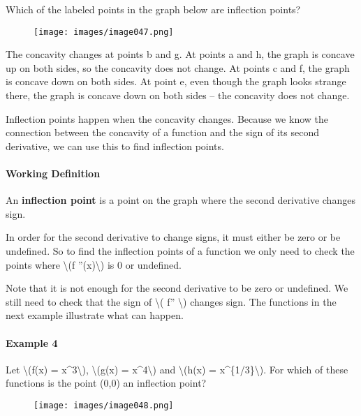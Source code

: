 Which of the labeled points in the graph below are inflection points?

\begin{figure}
\centering
\texttt{[image: images/image047.png]}
\caption{}
\end{figure}

The concavity changes at points b and g. At points a and h, the graph is
concave up on both sides, so the concavity does not change. At points c
and f, the graph is concave down on both sides. At point e, even though
the graph looks strange there, the graph is concave down on both sides
-- the concavity does not change.

Inflection points happen when the concavity changes. Because we know the
connection between the concavity of a function and the sign of its
second derivative, we can use this to find inflection points.

\hypertarget{working-definition}{%
\paragraph{Working Definition}\label{working-definition}}

An \textbf{inflection point} is a point on the graph where the second
derivative changes sign.

In order for the second derivative to change signs, it must either be
zero or be undefined. So to find the inflection points of a function we
only need to check the points where \textbackslash{}(f
''(x)\textbackslash{}) is 0 or undefined.

Note that it is not enough for the second derivative to be zero or
undefined. We still need to check that the sign of \textbackslash{}( f''
\textbackslash{}) changes sign. The functions in the next example
illustrate what can happen.

\hypertarget{example-4}{%
\paragraph{Example 4}\label{example-4}}

Let \textbackslash{}(f(x) = x\^{}3\textbackslash{}),
\textbackslash{}(g(x) = x\^{}4\textbackslash{}) and
\textbackslash{}(h(x) = x\^{}\{1/3\}\textbackslash{}). For which of
these functions is the point (0,0) an inflection point?

\begin{figure}
\centering
\texttt{[image: images/image048.png]}
\caption{}
\end{figure}

